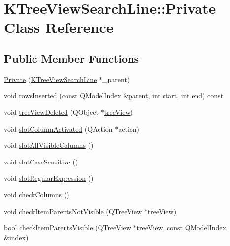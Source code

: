 \hypertarget{classKTreeViewSearchLine_1_1Private}{\section{K\+Tree\+View\+Search\+Line\+:\+:Private Class Reference}
\label{classKTreeViewSearchLine_1_1Private}
}
\subsection*{Public Member Functions}
\begin{DoxyCompactItemize}
\item 
\hyperlink{classKTreeViewSearchLine_1_1Private_a72cdd6023812de4dbdcd4f6df30af236}{Private} (\hyperlink{classKTreeViewSearchLine}{K\+Tree\+View\+Search\+Line} $\ast$\+\_\+parent)
\item 
void \hyperlink{classKTreeViewSearchLine_1_1Private_a64c412338db91da13121c5f9aa54e5ab}{rows\+Inserted} (const Q\+Model\+Index \&\hyperlink{classKTreeViewSearchLine_1_1Private_a423d46500ac68a1bd6b552ef18d1ef5a}{parent}, int start, int end) const 
\item 
void \hyperlink{classKTreeViewSearchLine_1_1Private_ade5c23ad56c4d74683a9bca30abf35e7}{tree\+View\+Deleted} (Q\+Object $\ast$\hyperlink{classKTreeViewSearchLine_aeeec1dac59277de847c59fbad49d53b6}{tree\+View})
\item 
void \hyperlink{classKTreeViewSearchLine_1_1Private_a90f7407db99ff2b0e90cee93f3b78a08}{slot\+Column\+Activated} (Q\+Action $\ast$action)
\item 
void \hyperlink{classKTreeViewSearchLine_1_1Private_a5a90bf6ebee7cd929d6e2b8a65784d0a}{slot\+All\+Visible\+Columns} ()
\item 
void \hyperlink{classKTreeViewSearchLine_1_1Private_a7af91b0447869beb1e46dc82a4f5abd9}{slot\+Case\+Sensitive} ()
\item 
void \hyperlink{classKTreeViewSearchLine_1_1Private_acd468d1796361a194388313fd119ba6e}{slot\+Regular\+Expression} ()
\item 
void \hyperlink{classKTreeViewSearchLine_1_1Private_a5e46c84da7f32694b6de94982fb6d53a}{check\+Columns} ()
\item 
void \hyperlink{classKTreeViewSearchLine_1_1Private_ae08157a870a33a1ada866e2810ba59a3}{check\+Item\+Parents\+Not\+Visible} (Q\+Tree\+View $\ast$\hyperlink{classKTreeViewSearchLine_aeeec1dac59277de847c59fbad49d53b6}{tree\+View})
\item 
bool \hyperlink{classKTreeViewSearchLine_1_1Private_aec44f42e82456b943bfb15ee78a5d3ea}{check\+Item\+Parents\+Visible} (Q\+Tree\+View $\ast$\hyperlink{classKTreeViewSearchLine_aeeec1dac59277de847c59fbad49d53b6}{tree\+View}, const Q\+Model\+Index \&index)
\end{DoxyCompactItemize}
